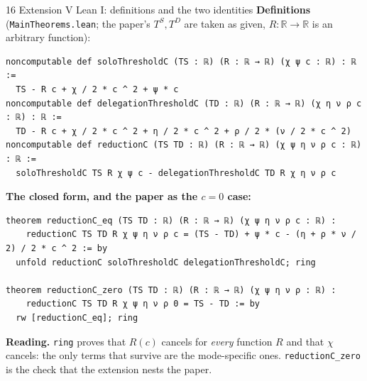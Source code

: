 \documentclass[aspectratio=169,11pt]{beamer}
\begin{document}
\begin{frame}[fragile]{16 \textperiodcentered{} Extension V \textperiodcentered{} Lean I: definitions and the two identities}
  \small\textbf{Definitions} (\texttt{MainTheorems.lean}; the paper's $T^S,T^D$ are taken as given, $R:\mathbb R\to\mathbb R$ is an arbitrary function):
\begin{lstlisting}
noncomputable def soloThresholdC (TS : ℝ) (R : ℝ → ℝ) (χ ψ c : ℝ) : ℝ :=
  TS - R c + χ / 2 * c ^ 2 + ψ * c
noncomputable def delegationThresholdC (TD : ℝ) (R : ℝ → ℝ) (χ η ν ρ c : ℝ) : ℝ :=
  TD - R c + χ / 2 * c ^ 2 + η / 2 * c ^ 2 + ρ / 2 * (ν / 2 * c ^ 2)
noncomputable def reductionC (TS TD : ℝ) (R : ℝ → ℝ) (χ ψ η ν ρ c : ℝ) : ℝ :=
  soloThresholdC TS R χ ψ c - delegationThresholdC TD R χ η ν ρ c
\end{lstlisting}
  \textbf{The closed form, and the paper as the $c=0$ case:}
\begin{lstlisting}
theorem reductionC_eq (TS TD : ℝ) (R : ℝ → ℝ) (χ ψ η ν ρ c : ℝ) :
    reductionC TS TD R χ ψ η ν ρ c = (TS - TD) + ψ * c - (η + ρ * ν / 2) / 2 * c ^ 2 := by
  unfold reductionC soloThresholdC delegationThresholdC; ring

theorem reductionC_zero (TS TD : ℝ) (R : ℝ → ℝ) (χ ψ η ν ρ : ℝ) :
    reductionC TS TD R χ ψ η ν ρ 0 = TS - TD := by
  rw [reductionC_eq]; ring
\end{lstlisting}
  \textbf{Reading.} \texttt{ring} proves that $R(c)$ cancels for \emph{every} function $R$ and that $\chi$
  cancels: the only terms that survive are the mode-specific ones. \texttt{reductionC\_zero} is the check
  that the extension nests the paper.
\end{frame}
\end{document}
